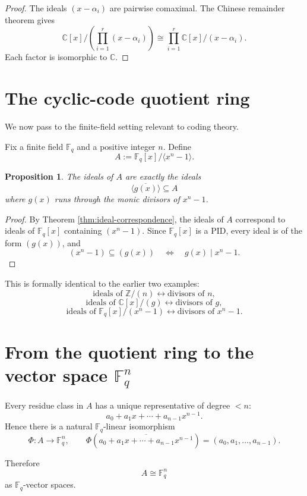 \documentclass[11pt]{article}
\newtheorem{proposition}[theorem]{Proposition}
\theoremstyle{definition}
\newcommand{\Z}{\mathbb{Z}}
\newcommand{\C}{\mathbb{C}}
\newcommand{\F}{\mathbb{F}}
\newcommand{\ideal}[1]{\langle #1\rangle}
\newcommand{\ol}[1]{\overline{#1}}
\begin{document}
	\begin{proof}
		The ideals \((x-\alpha_i)\) are pairwise comaximal. The Chinese remainder theorem gives
		\[
		\C[x]/\left(\prod_{i=1}^r (x-\alpha_i)\right)
		\cong
		\prod_{i=1}^r \C[x]/(x-\alpha_i).
		\]
		Each factor is isomorphic to \(\C\).
	\end{proof}
	
	\section{The cyclic-code quotient ring}
	
	We now pass to the finite-field setting relevant to coding theory.
	
	Fix a finite field \(\F_q\) and a positive integer \(n\). Define
	\[
	A:=\F_q[x]/\ideal{x^n-1}.
	\]
	
	\begin{proposition}\label{prop:cyclic-ring-ideals}
		The ideals of \(A\) are exactly the ideals
		\[
		\ideal{\ol{g(x)}}\subseteq A
		\]
		where \(g(x)\) runs through the monic divisors of \(x^n-1\).
	\end{proposition}
	
	\begin{proof}
		By Theorem \ref{thm:ideal-correspondence}, the ideals of \(A\) correspond to ideals of \(\F_q[x]\) containing \((x^n-1)\). Since \(\F_q[x]\) is a PID, every ideal is of the form \((g(x))\), and
		\[
		(x^n-1)\subseteq (g(x))
		\quad\Longleftrightarrow\quad
		g(x)\mid x^n-1.
		\]
	\end{proof}
	
	This is formally identical to the earlier two examples:
	\[
	\text{ideals of }\Z/(n)\leftrightarrow \text{divisors of }n,
	\]
	\[
	\text{ideals of }\C[x]/(g)\leftrightarrow \text{divisors of }g,
	\]
	\[
	\text{ideals of }\F_q[x]/(x^n-1)\leftrightarrow \text{divisors of }x^n-1.
	\]
	
	\section{From the quotient ring to the vector space \(\F_q^n\)}
	
	Every residue class in \(A\) has a unique representative of degree \(<n\):
	\[
	a_0+a_1x+\cdots+a_{n-1}x^{n-1}.
	\]
	Hence there is a natural \(\F_q\)-linear isomorphism
	\[
	\Phi:A\to \F_q^n,
	\qquad
	\Phi\!\left(\ol{a_0+a_1x+\cdots+a_{n-1}x^{n-1}}\right)
	=
	(a_0,a_1,\dots,a_{n-1}).
	\]
	
	Therefore
	\[
	A\cong \F_q^n
	\]
	as \(\F_q\)-vector spaces.
	
\end{document}
